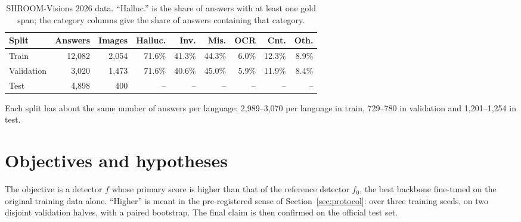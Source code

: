 \begin{table}[!htb]
    \centering
    \caption{SHROOM-Visions 2026 data. ``Halluc.'' is the share of answers with at least one gold span; the category columns give the share of answers containing that category.}
    \label{tab:data}
    \begin{tabular}{lrrrrrrrr}
    \toprule
    Split & Answers & Images & Halluc. & Inv. & Mis. & OCR & Cnt. & Oth. \\
    \midrule
    Train & 12,082 & 2,054 & 71.6\% & 41.3\% & 44.3\% & 6.0\% & 12.3\% & 8.9\% \\
    Validation & 3,020 & 1,473 & 71.6\% & 40.6\% & 45.0\% & 5.9\% & 11.9\% & 8.4\% \\
    Test & 4,898 & 400 & -- & -- & -- & -- & -- & -- \\
    \bottomrule
    \end{tabular}
\end{table}

Each split has about the same number of answers per language: 2,989--3,070 per language in train, 729--780 in validation and 1,201--1,254 in test.

\section{Objectives and hypotheses}\label{sec:hypotheses}

The objective is a detector $f$ whose primary score is higher than that of the reference detector $f_0$, the best backbone fine-tuned on the original training data alone. ``Higher'' is meant in the pre-registered sense of Section~\ref{sec:protocol}: over three training seeds, on two disjoint validation halves, with a paired bootstrap. The final claim is then confirmed on the official test set.

